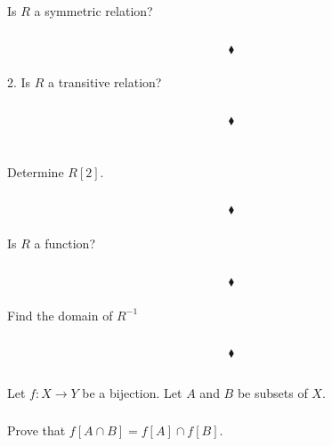 \subsubsection{}
\begin{tcolorbox}
Is $R$ a symmetric relation? 
\end{tcolorbox}
$$ $$
 
$$\blacklozenge$$
\subsubsection{}
\begin{tcolorbox}

2. Is $R$ a transitive relation? 
\end{tcolorbox}
$$ $$
 
$$\blacklozenge$$\\
\subsubsection{}
\begin{tcolorbox}
Determine $R[2]$. 
\end{tcolorbox}
$$ $$
 
$$\blacklozenge$$
\subsubsection{}
\begin{tcolorbox}
Is $R$ a function? 
\end{tcolorbox}
$$ $$
 
$$\blacklozenge$$
\subsubsection{}
\begin{tcolorbox}
Find the domain of $R^{-1}$
\end{tcolorbox}
$$ $$
 
$$\blacklozenge$$


\renewcommand{\thesubsection}{\thesection.\RomanNumeralCaps{5}}
\subsection{}
Let $f: X\rightarrow Y$ be a bijection. Let $A$ and $B$ be subsets of $X$.

\subsubsection{}
\begin{tcolorbox}
Prove that $f[A \cap B] = f[A] \cap  f[B]$.
\end{tcolorbox}
$$ $$

